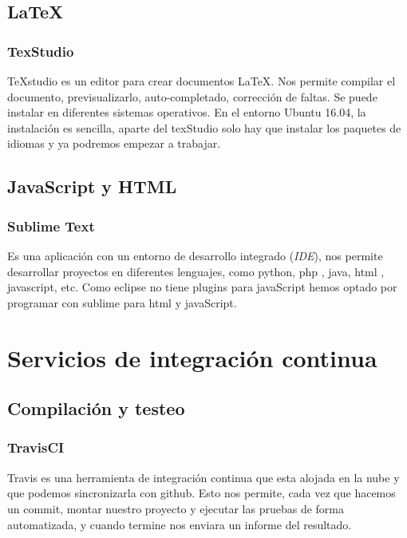 \subsection{LaTeX}\label{latex}

\subsubsection{TexStudio}\label{texstudio}

TeXstudio es un editor para crear documentos LaTeX. Nos permite compilar el documento, previsualizarlo, auto-completado, corrección de faltas. Se puede instalar en diferentes sistemas operativos. En el entorno Ubuntu 16.04, la instalación es sencilla, aparte del texStudio solo hay que instalar los paquetes de idiomas y ya podremos empezar a trabajar. \cite{web:texstudio}

\subsection{JavaScript y HTML}\label{javascript-y-html}

\subsubsection{Sublime Text}\label{sublime-text}

Es una aplicación con un entorno de desarrollo integrado (\emph{IDE}), nos permite desarrollar proyectos en diferentes lenguajes, como python, php , java, html , javascript, etc. Como eclipse no tiene plugins para javaScript hemos optado por programar con sublime para html y javaScript. \cite{web:sublime}

\section{Servicios de integración
	continua}\label{servicios-de-integraciuxf3n-continua}

\subsection{Compilación y testeo}\label{compilacion-y-testeo}

\subsubsection{TravisCI}\label{travis-ci}

Travis es una herramienta de integración continua que esta alojada en la nube y que podemos sincronizarla con github. Esto nos permite, cada vez que hacemos un commit, montar nuestro proyecto y ejecutar las pruebas de forma automatizada, y cuando termine nos enviara un informe del resultado. \cite{web:travis}


